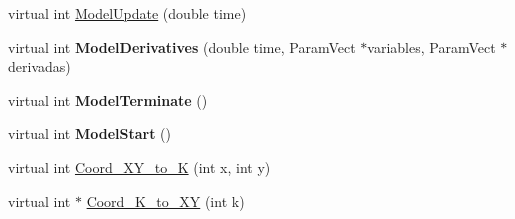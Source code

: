 \begin{DoxyCompactItemize}
\item 
virtual int \hyperlink{classgeneric2dtissueProstate_a8af733cdd06ed6715e4b97777f531791}{Model\+Update} (double time)
\item 
virtual int {\bfseries Model\+Derivatives} (double time, Param\+Vect $\ast$variables, Param\+Vect $\ast$derivadas)\hypertarget{classgeneric2dtissueProstate_a93efcd63ff8a516b09ddc0f580e8cf54}{}\label{classgeneric2dtissueProstate_a93efcd63ff8a516b09ddc0f580e8cf54}

\item 
virtual int {\bfseries Model\+Terminate} ()\hypertarget{classgeneric2dtissueProstate_ac8b11927af55f881f3836eb64894f8f8}{}\label{classgeneric2dtissueProstate_ac8b11927af55f881f3836eb64894f8f8}

\item 
virtual int {\bfseries Model\+Start} ()\hypertarget{classgeneric2dtissueProstate_a3c9817212ac7fe2c283a28e5203aa39d}{}\label{classgeneric2dtissueProstate_a3c9817212ac7fe2c283a28e5203aa39d}

\item 
virtual int \hyperlink{classgeneric2dtissueProstate_acb29ebe398626545370adf26d5ceaead}{Coord\+\_\+\+X\+Y\+\_\+to\+\_\+K} (int x, int y)
\item 
virtual int $\ast$ \hyperlink{classgeneric2dtissueProstate_af729bbe740db467988319968b873a630}{Coord\+\_\+\+K\+\_\+to\+\_\+\+XY} (int k)
\end{DoxyCompactItemize}
